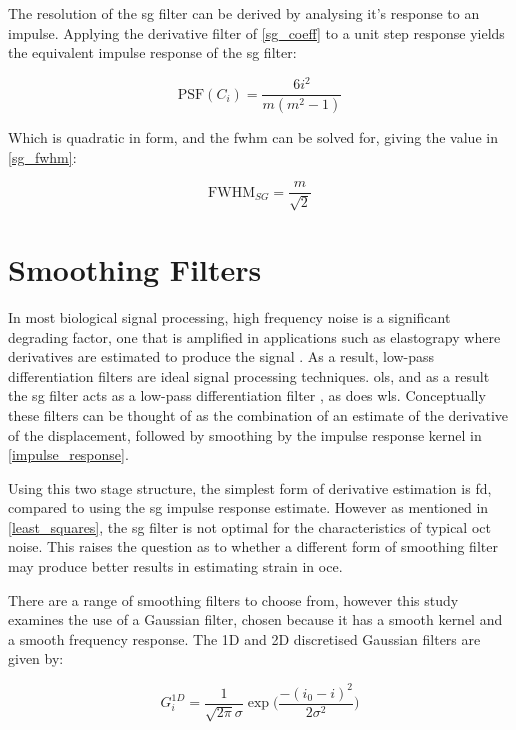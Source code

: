 The resolution of the \ac{sg} filter can be derived by analysing it's response to an impulse. Applying the derivative filter of \autoref{sg_coeff} to a unit step response yields the equivalent impulse response of the \ac{sg} filter:

\begin{equation}
	\text{PSF} (C_i)=\frac{6 i^2}{m(m^2-1)}
	\label{impulse_response}
\end{equation}

Which is quadratic in form, and the \ac{fwhm} can be solved for, giving the value in \autoref{sg_fwhm}:

\begin{equation}
	\label{sg_fwhm}
	\text{FWHM}_{SG} = \frac{m}{\sqrt{2}}
\end{equation}

\section{Smoothing Filters}
In most biological signal processing, high frequency noise is a significant degrading factor, one that is amplified in applications such as elastograpy where derivatives are estimated to produce the signal \cite{usui_digital_1982}. As a result, low-pass differentiation filters are ideal signal processing techniques. \ac{ols}, and as a result the \ac{sg} filter acts as a low-pass differentiation filter \cite{luo_axial_2004}, as does \ac{wls}.
Conceptually these filters can be thought of as the combination of an estimate of the derivative of the displacement, followed by smoothing by the impulse response kernel in \ref{impulse_response}.

Using this two stage structure, the simplest form of derivative estimation is \ac{fd}, compared to using the \ac{sg} impulse response estimate. However as mentioned in \autoref{least_squares}, the \ac{sg} filter is not optimal for the characteristics of typical \ac{oct} noise.
This raises the question as to whether a different form of smoothing filter may produce better results in estimating strain in \ac{oce}. 

There are a range of smoothing filters to choose from, however this study examines the use of a Gaussian filter, chosen because it has a smooth kernel and a smooth frequency response. The 1D and 2D discretised Gaussian filters are given by:

\begin{equation}
	\label{gauss_1d}
	G^{1D}_i = \frac{1}{\sqrt{2\pi} \sigma} \exp{\bigg(\frac{-(i_0-i)^2}{2 \sigma^2}\bigg)}
\end{equation}

